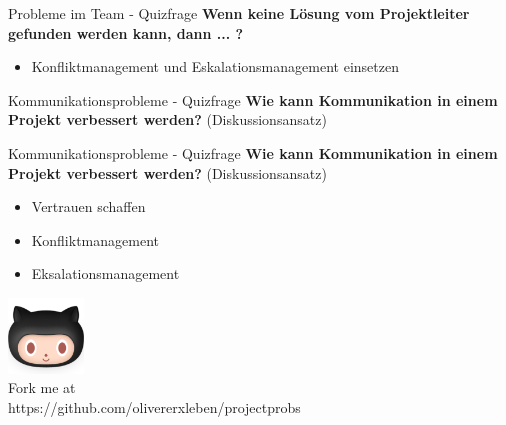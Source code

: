 \documentclass[12pt]{beamer}
\begin{document}
	\begin{frame}{Probleme im Team - Quizfrage}
		\textbf{Wenn keine Lösung vom Projektleiter gefunden werden kann, dann ... ?}
		\begin{itemize}
			\item{Konfliktmanagement und Eskalationsmanagement einsetzen}
		\end{itemize}

	\end{frame}

	\begin{frame}{Kommunikationsprobleme - Quizfrage}
		\textbf{Wie kann Kommunikation in einem Projekt verbessert werden?} (Diskussionsansatz)
	\end{frame}

	\begin{frame}{Kommunikationsprobleme - Quizfrage}
		\textbf{Wie kann Kommunikation in einem Projekt verbessert werden?} (Diskussionsansatz)\\
		\begin{itemize}
			\item{Vertrauen schaffen}
			\item{Konfliktmanagement}
			\item{Eksalationsmanagement}
		\end{itemize}

	\end{frame}

	\thispagestyle{empty}
	\begin{frame}
		\begin{center}
			\includegraphics[width=0.15\textwidth]{images/github} \\
			Fork me at \\
			https://github.com/olivererxleben/projectprobs
		\end{center}
	\end{frame}
\end{document}
